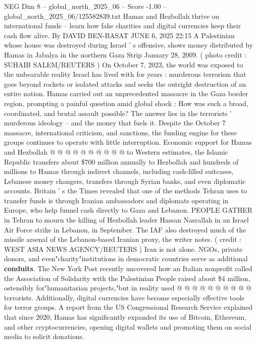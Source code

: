 \begin{textsample}{NEG Dim 8 – global\_north\_2025\_06 – Score -1.00 – global\_north\_2025\_06/125582839.txt}  \label{ex:f8_neg_400}
Hamas and Hezbollah thrive on international funds -- learn how fake charities and digital currencies keep their cash flow alive.
By DAVID BEN-BASAT JUNE 6, 2025 22:15 A Palestinian whose house was destroyed during Israel ' s offensive, shows money distributed by Hamas in Jabalya in the northern Gaza Strip January 28, 2009. ( photo credit : SUHAIB SALEM/REUTERS ) On October 7, 2023, the world was exposed to the unbearable reality Israel has lived with for years : murderous terrorism that goes beyond rockets or isolated attacks and seeks the outright destruction of an entire nation.
Hamas carried out an unprecedented massacre in the Gaza border region, prompting a painful question amid global shock : How was such a broad, coordinated, and brutal assault possible?
The answer lies in the terrorists ' murderous ideology -- and the money that fuels it.
Despite the October 7 massacre, international criticism, and sanctions, the funding engine for these groups continues to operate with little interruption.
Economic support for Hamas and Hezbollah @ @ @ @ @ @ @ @ @ @ to Western estimates, the Islamic Republic transfers about \$700 million annually to Hezbollah and hundreds of millions to Hamas through indirect channels, including cash-filled suitcases, Lebanese money changers, transfers through Syrian banks, and even diplomatic accounts.
Britain ' s the Times revealed that one of the methods Tehran uses to transfer funds is through Iranian ambassadors and diplomats operating in Europe, who help funnel cash directly to Gaza and Lebanon.
PEOPLE GATHER in Tehran to mourn the killing of Hezbollah leader Hassan Nasrallah in an Israel Air Force strike in Lebanon, in September.
The IAF also destroyed much of the missile arsenal of the Lebanon-based Iranian proxy, the writer notes. ( credit : WEST ASIA NEWS AGENCY/REUTERS ) Iran is not alone.
NGOs, private donors, and even"charity"institutions in democratic countries serve as additional \textbf{conduits}.
The New York Post recently uncovered how an Italian nonprofit called the Association of Solidarity with the Palestinian People raised about \$4 million, ostensibly for"humanitarian projects,"but in reality used @ @ @ @ @ @ @ @ @ @ terrorists.
Additionally, digital currencies have become especially effective tools for terror groups.
A report from the US Congressional Research Service explained that since 2020, Hamas has significantly expanded its use of Bitcoin, Ethereum, and other cryptocurrencies, opening digital wallets and promoting them on social media to solicit donations.

\end{textsample}
